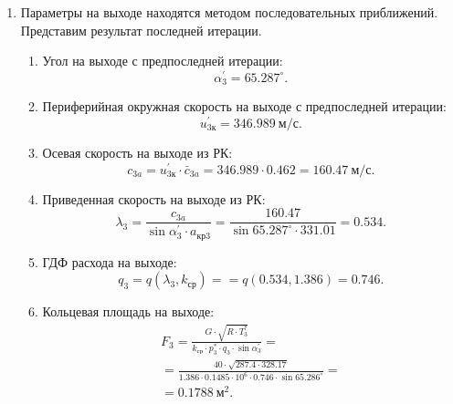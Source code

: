 \documentclass[a4paper,10pt]{article}
\begin{document}
\begin{enumerate}
        \item Параметры на выходе находятся методом последовательных приближений. Представим результат последней итерации.
        \begin{enumerate}

            \item Угол на выходе с предпоследней итерации:
            \[
                \alpha_3^\prime = 65.287^\circ.
            \]

            \item Периферийная окружная скорость на выходе с предпоследней итерации:
            \[
                u_{3к}^\prime = 346.989\ м/с.
            \] 

            \item Осевая скорость на выходе из РК:
            \[
                c_{3a} = u_{3к}^\prime \cdot \bar{c}_{3a} = 
                346.989 \cdot 0.462 = 
                160.47\ м/с.
            \]

            \item Приведенная скорость на выходе из РК:
            \[
                \lambda_3 = \frac{ c_{3a} }{ \sin{\alpha_3^\prime} \cdot a_{кр3} } = 
                \frac{ 160.47 
                }{ 
                    \sin{65.287^\circ} \cdot 331.01 } =
                0.534. 
            \]

            \item ГДФ расхода на выходе:
            \[
                q_3 = q(\lambda_3, k_{ср}) = = q(0.534, 1.386) = 
                0.746.
            \]

            \item Кольцевая площадь на выходе:
            \begin{gather*}
                F_3 = \frac{ G \cdot \sqrt{R \cdot T_3^*} }{ k_{ср} \cdot p_3^* \cdot q_3 \cdot \sin{\alpha_3^\prime} } =\\ 
                =\frac{ 
                    40 \cdot \sqrt{ 287.4 \cdot 328.17}
                }{ 
                    1.386 \cdot 0.1485 \cdot 10^6 \cdot 0.746 
                    \cdot \sin{65.286^\circ} 
                } =\\ 
                =0.1788\ м^2.\\
            \end{gather*}


\end{enumerate}
\end{enumerate}
\end{document}
